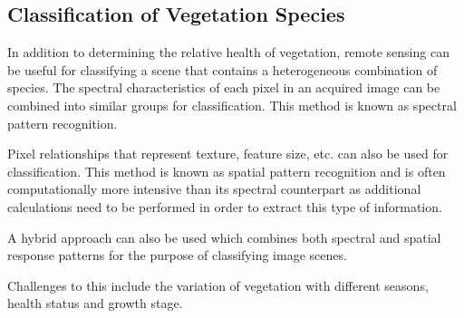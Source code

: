 \subsection{Classification of Vegetation Species}
In addition to determining the relative health of vegetation, remote sensing can be useful for classifying a scene that contains a heterogeneous combination of species.  The spectral characteristics of each pixel in an acquired image can be combined into similar groups for classification.  This method is known as spectral pattern recognition.

Pixel relationships that represent texture, feature size, etc. can also be used for classification.  This method is known as spatial pattern recognition and is often computationally more intensive than its spectral counterpart as additional calculations need to be performed in order to extract this type of information.

A hybrid approach can also be used which combines both spectral and spatial response patterns for the purpose of classifying image scenes.

Challenges to this include the variation of vegetation with different seasons, health status and growth stage.
